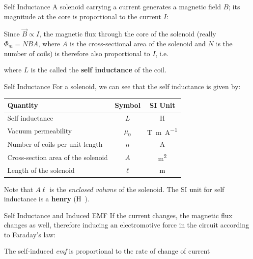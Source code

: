 \documentclass[12pt,aspectratio=169]{beamer}
\begin{document}
\begin{frame}{Self Inductance}
  A solenoid carrying a current generates a magnetic field $B$; its magnitude at
  the core is proportional to the current $I$:


  Since $\vec B\propto I$, the magnetic flux through the core of the solenoid
  (really $\Phi_m=NBA$, where $A$ is the cross-sectional area of the solenoid
  and $N$ is the number of coils) is therefore also proportional to $I$, i.e.


  where $L$ is the called the \textbf{self inductance} of the coil.
\end{frame}



\begin{frame}{Self Inductance}
  For a solenoid, we can see that the self inductance is given by:


  \begin{center}
    \begin{tabular}{l|c|c}
      \rowcolor{pink}
      \textbf{Quantity} & \textbf{Symbol} & \textbf{SI Unit} \\ \hline
      Self inductance & $L$ & \si\henry\\
      Vacuum permeability & $\mu_0$ & \si{\tesla.\metre\per\ampere} \\
      Number of coils per unit length & $n$ & \si\ampere \\
      Cross-section area of the solenoid & $A$ & \si{\metre\squared} \\
      Length of the solenoid & $\ell$ & \si\metre
    \end{tabular}
  \end{center}
  Note that $A\ell$ is the \emph{enclosed volume} of the solenoid. The SI unit
  for self inductance is a \textbf{henry} (\si\henry).
\end{frame}



\begin{frame}{Self Inductance and Induced EMF}
  If the current changes, the magnetic flux changes as well, therefore inducing
  an electromotive force in the circuit according to Faraday's law:


  The self-induced \emph{emf} is proportional to the rate of change of current
\end{frame}
\end{document}

